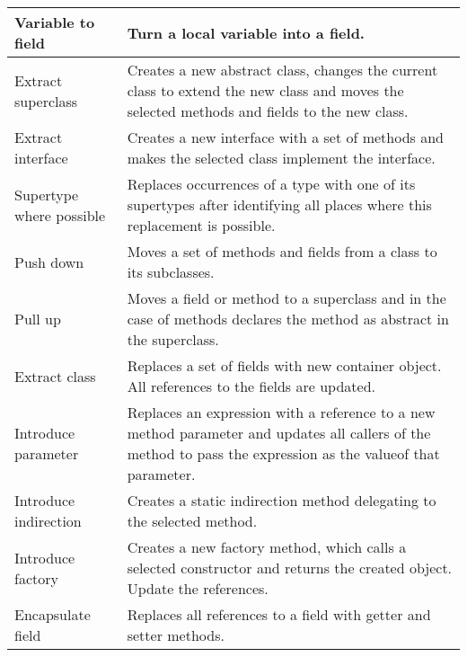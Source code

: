 \begin{table}[h]
\begin{tabular}{p{3 cm} | p{10.5 cm}}
Variable to field         & Turn a local variable into a field.                                                                                                                                       \\ \hline
Extract superclass        & Creates a new abstract class, changes the current class to extend the new class and moves the selected methods and fields to the new class.                               \\ \hline
Extract interface         & Creates a new interface with a set of methods and makes the selected class implement the interface.                                                                       \\ \hline
Supertype where possible  & Replaces occurrences of a type with one of its supertypes after identifying all places where this replacement is possible.                                                \\ \hline
Push down                 & Moves a set of methods and fields from a class to its subclasses.                                                                                                         \\ \hline
Pull up                   & Moves a field or method to a superclass and in the case of methods declares the method as abstract in the superclass.                                                     \\ \hline
Extract class             & Replaces a set of fields with new container object. All references to the fields are updated.                                                                             \\ \hline
Introduce parameter       & Replaces an expression with a reference to a new method parameter and updates all callers of the method to pass the expression as the valueof that parameter.             \\ \hline
Introduce indirection     & Creates a static indirection method delegating to the selected method.                                                                                                    \\ \hline
Introduce factory         & Creates a new factory method, which calls a selected constructor and returns the created object. Update the references.                                                   \\ \hline
Encapsulate field         & Replaces all references to a field with getter and setter methods.                                                                                                        \\ \hline

\end{tabular}
\end{table}
